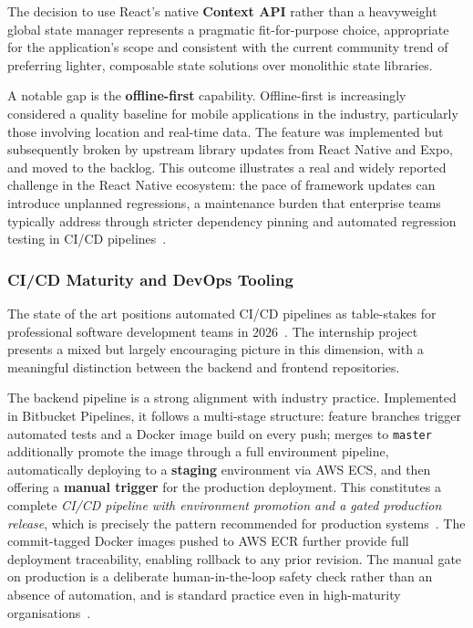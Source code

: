 The decision to use React's native \textbf{Context API} rather than a
heavyweight global state manager represents a pragmatic
fit-for-purpose choice, appropriate for the application's scope and
consistent with the current community trend of preferring lighter,
composable state solutions over monolithic state libraries.
 
A notable gap is the \textbf{offline-first} capability.
Offline-first is increasingly considered a quality baseline for mobile
applications in the industry, particularly those involving location
and real-time data. The feature was implemented but subsequently
broken by upstream library updates from React Native and Expo, and
moved to the backlog. This outcome illustrates a real and widely
reported challenge in the React Native ecosystem: the pace of
framework updates can introduce unplanned regressions, a maintenance
burden that enterprise teams typically address through stricter
dependency pinning and automated regression testing in CI/CD
pipelines~\cite{devopsdotcom2025}.
 
 
\subsubsection{CI/CD Maturity and DevOps
Tooling}\label{subsub:contrast:aidevops}
 
The state of the art positions automated CI/CD pipelines as
table-stakes for professional software development teams in
2026~\cite{perforce2026devops,harness2026devops}.
The internship project presents a mixed but largely encouraging
picture in this dimension, with a meaningful distinction between the
backend and frontend repositories.
 
The backend pipeline is a strong alignment with industry practice.
Implemented in Bitbucket Pipelines, it follows a multi-stage
structure: feature branches trigger automated tests and a Docker
image build on every push; merges to \texttt{master} additionally
promote the image through a full environment pipeline, automatically
deploying to a \textbf{staging} environment via AWS ECS, and then
offering a \textbf{manual trigger} for the production deployment.
This constitutes a complete \textit{CI/CD pipeline with environment
promotion and a gated production release}, which is precisely the
pattern recommended for production systems~\cite{perforce2026devops}.
The commit-tagged Docker images pushed to AWS ECR further provide
full deployment traceability, enabling rollback to any prior
revision. The manual gate on production is a deliberate
human-in-the-loop safety check rather than an absence of automation,
and is standard practice even in high-maturity
organisations~\cite{perforce2026devops}.
 
